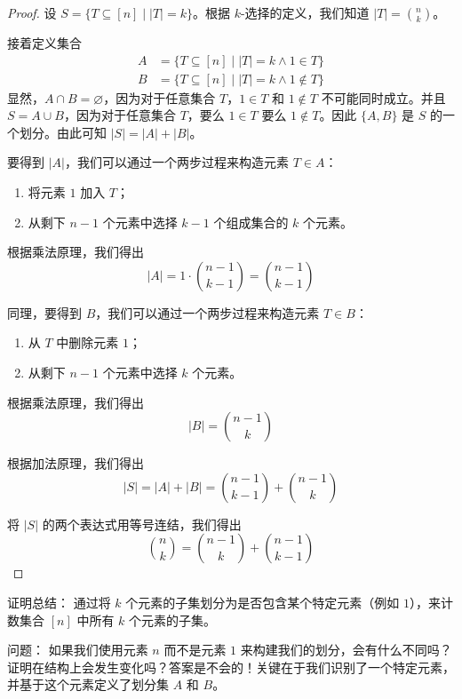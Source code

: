 \begin{proof}
    设 $S = \{T \subseteq [n] \mid |T| = k\}$。根据 $k$-选择的定义，我们知道 $|T| = {n \choose k}$。

    接着定义集合
    \begin{align*}
        A & = \{T \subseteq [n] \mid |T| = k ∧ 1 \in T\}    \\
        B & = \{T \subseteq [n] \mid |T| = k ∧ 1 \notin T\}
    \end{align*}
    显然，$A \cap B = \varnothing$，因为对于任意集合 $T$，$1 \in T$ 和 $1 \notin T$ 不可能同时成立。并且 $S = A \cup B$，因为对于任意集合 $T$，要么 $1 \in T$ 要么 $1 \notin T$。因此 $\{A,B\}$ 是 $S$ 的一个划分。由此可知 $|S| = |A| + |B|$。

    要得到 $|A|$，我们可以通过一个两步过程来构造元素 $T \in A$：
    \begin{enumerate}[label=(\arabic*)]
        \item 将元素 $1$ 加入 $T$；
        \item 从剩下 $n-1$ 个元素中选择 $k-1$ 个组成集合的 $k$ 个元素。
    \end{enumerate}
    根据乘法原理，我们得出
    \[|A| = 1 \cdot {n-1 \choose k-1} = {n-1 \choose k-1}\]

    同理，要得到 $B$，我们可以通过一个两步过程来构造元素 $T \in B$：
    \begin{enumerate}[label=(\arabic*)]
        \item 从 $T$ 中删除元素 $1$；
        \item 从剩下 $n-1$ 个元素中选择 $k$ 个元素。
    \end{enumerate}
    根据乘法原理，我们得出
    \[|B| = {n-1 \choose k}\]

    根据加法原理，我们得出
    \[|S|=|A|+|B| = {n-1 \choose k-1} + {n-1 \choose k}\]

    将 $|S|$ 的两个表达式用等号连结，我们得出
    \[{n \choose k}={n-1 \choose k}+{n-1 \choose k-1}\]
\end{proof}

\begin{questions}{证明总结：}
    通过将 $k$ 个元素的子集划分为是否包含某个特定元素（例如 $1$），来计数集合 $[n]$ 中所有 $k$ 个元素的子集。
\end{questions}

\begin{questions}{问题：}
    如果我们使用元素 $n$ 而不是元素 $1$ 来构建我们的划分，会有什么不同吗？证明在结构上会发生变化吗？答案是不会的！关键在于我们识别了一个特定元素，并基于这个元素定义了划分集 $A$ 和 $B$。
\end{questions}

